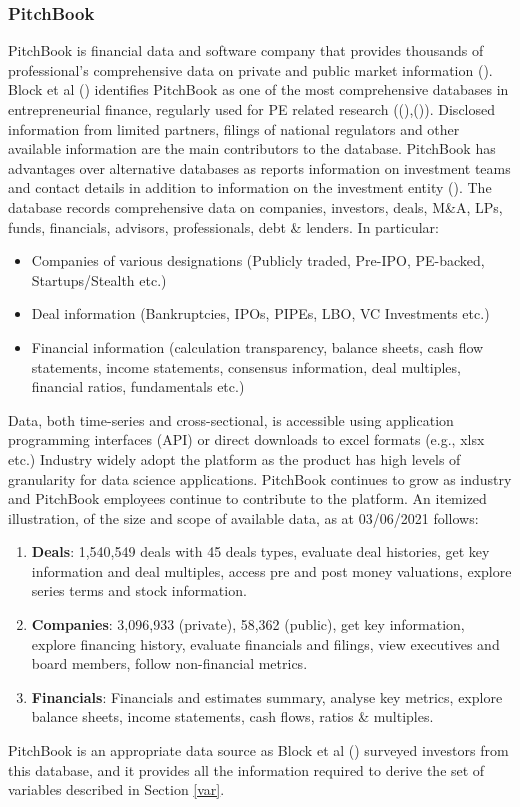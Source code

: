 \documentclass[12pt]{article}
\begin{document}
\subsubsection{PitchBook}
PitchBook is financial data and software company that provides thousands of professional's comprehensive data on private and public market information (\cite{PB}).
Block et al (\citeyear{BLOCK2019329}) identifies PitchBook as one of the most comprehensive databases in entrepreneurial finance, regularly used for PE related research ((\cite{kaplan2016venture}),(\cite{PAGLIA2014177})).
Disclosed information from limited partners, filings of national regulators and other available information are the main contributors to the database.
PitchBook has advantages over alternative databases as reports information on investment teams and contact details in addition to information on the investment entity (\cite{brown2015different}).
The database records comprehensive data on companies, investors, deals, M\&A, LPs, funds, financials, advisors, professionals, debt \& lenders.
In particular:
\begin{itemize}
	\item Companies of various designations (Publicly traded, Pre-IPO, PE-backed, Startups/Stealth etc.)
	\item Deal information (Bankruptcies, IPOs, PIPEs, LBO, VC Investments etc.)
	\item Financial information (calculation transparency, balance sheets, cash flow statements, income statements, consensus information, deal multiples, financial ratios, fundamentals etc.)
\end{itemize}
Data, both time-series and cross-sectional, is accessible using application programming interfaces (API) or direct downloads to excel formats (e.g., xlsx etc.)
Industry widely adopt the platform as the product has high levels of granularity for data science applications.
PitchBook continues to grow as industry and PitchBook employees continue to contribute to the platform.
An itemized illustration, of the size and scope of available data, as at 03/06/2021 follows:
\begin{enumerate}
	\item \textbf{Deals}: 1,540,549 deals with 45 deals types, evaluate deal histories, get key information and deal multiples, access pre and post money valuations, explore series terms and stock information.
	\item \textbf{Companies}: 3,096,933 (private), 58,362 (public), get key information, explore financing history, evaluate financials and filings, view executives and board members, follow non-financial metrics.
	\item \textbf{Financials}: Financials and estimates summary, analyse key metrics, explore balance sheets, income statements, cash flows, ratios \& multiples.
\end{enumerate}
PitchBook is an appropriate data source as Block et al (\citeyear{BLOCK2019329}) surveyed investors from this database,
and it provides all the information required to derive the set of variables described in Section \ref{var}.
\end{document}
